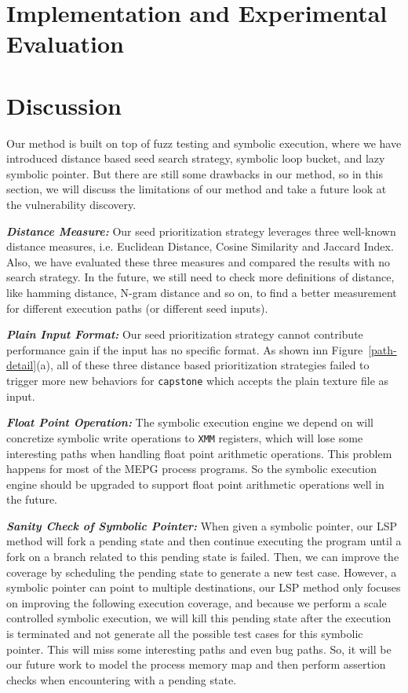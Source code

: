 \documentclass[a4paper]{article}
\begin{document}
\section{Implementation and Experimental Evaluation} \label{sec:evaluate}




\section{Discussion} \label{sec:discussion}
Our method is built on top of fuzz testing and symbolic execution, where we have introduced distance based seed search strategy, symbolic loop bucket, and lazy symbolic pointer. But there are still some drawbacks in our method, so in this section, we will discuss the limitations of our method and take a future look at the vulnerability discovery.

\noindent\textit{\textbf{Distance Measure:}} Our seed prioritization strategy leverages three well-known distance measures, i.e. Euclidean Distance, Cosine Similarity and Jaccard Index. Also, we have evaluated these three measures and compared the results with no search strategy. In the future, we still need to check more definitions of distance, like hamming distance, N-gram distance and so on, to find a better measurement for different execution paths (or different seed inputs). 

\noindent\textit{\textbf{Plain Input Format:}} Our seed prioritization strategy cannot contribute performance gain if the input has no specific format. As shown inn Figure~\ref{path-detail}(a), all of these three distance based prioritization strategies failed to trigger more new behaviors for \texttt{capstone} which accepts the plain texture file as input. 

\noindent\textit{\textbf{Float Point Operation:}} The symbolic execution engine we depend on will concretize symbolic write operations to \texttt{XMM} registers, which will lose some interesting paths when handling float point arithmetic operations. This problem happens for most of the MEPG process programs. So the symbolic execution engine should be upgraded to support float point arithmetic operations well in the future.

\noindent\textit{\textbf{Sanity Check of Symbolic Pointer:}} When given a symbolic pointer, our LSP method will fork a pending state and then continue executing the program until a fork on a branch related to this pending state is failed. Then, we can improve the coverage by scheduling the pending state to generate a new test case. However, a symbolic pointer can point to multiple destinations, our LSP method only focuses on improving the following execution coverage, and because we perform a scale controlled symbolic execution, we will kill this pending state after the execution is terminated and not generate all the possible test cases for this symbolic pointer. This will miss some interesting paths and even bug paths. So, it will be our future work to model the process memory map and then perform assertion checks when encountering with a pending state.
\end{document}
